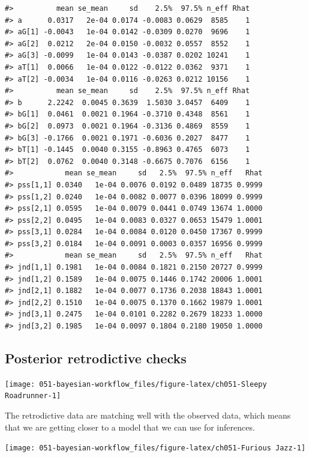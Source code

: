 \documentclass[11pt, oneside, openany]{scrbook}
\begin{document}
\begin{verbatim}
#>          mean se_mean     sd    2.5%  97.5% n_eff Rhat
#> a      0.0317   2e-04 0.0174 -0.0083 0.0629  8585    1
#> aG[1] -0.0043   1e-04 0.0142 -0.0309 0.0270  9696    1
#> aG[2]  0.0212   2e-04 0.0150 -0.0032 0.0557  8552    1
#> aG[3] -0.0099   1e-04 0.0143 -0.0387 0.0202 10241    1
#> aT[1]  0.0066   1e-04 0.0122 -0.0122 0.0362  9371    1
#> aT[2] -0.0034   1e-04 0.0116 -0.0263 0.0212 10156    1
#>          mean se_mean     sd    2.5%  97.5% n_eff Rhat
#> b      2.2242  0.0045 0.3639  1.5030 3.0457  6409    1
#> bG[1]  0.0461  0.0021 0.1964 -0.3710 0.4348  8561    1
#> bG[2]  0.0973  0.0021 0.1964 -0.3136 0.4869  8559    1
#> bG[3] -0.1766  0.0021 0.1971 -0.6036 0.2027  8477    1
#> bT[1] -0.1445  0.0040 0.3155 -0.8963 0.4765  6073    1
#> bT[2]  0.0762  0.0040 0.3148 -0.6675 0.7076  6156    1
#>            mean se_mean     sd   2.5%  97.5% n_eff   Rhat
#> pss[1,1] 0.0340   1e-04 0.0076 0.0192 0.0489 18735 0.9999
#> pss[1,2] 0.0240   1e-04 0.0082 0.0077 0.0396 18099 0.9999
#> pss[2,1] 0.0595   1e-04 0.0079 0.0441 0.0749 13674 1.0000
#> pss[2,2] 0.0495   1e-04 0.0083 0.0327 0.0653 15479 1.0001
#> pss[3,1] 0.0284   1e-04 0.0084 0.0120 0.0450 17367 0.9999
#> pss[3,2] 0.0184   1e-04 0.0091 0.0003 0.0357 16956 0.9999
#>            mean se_mean     sd   2.5%  97.5% n_eff   Rhat
#> jnd[1,1] 0.1981   1e-04 0.0084 0.1821 0.2150 20727 0.9999
#> jnd[1,2] 0.1589   1e-04 0.0075 0.1446 0.1742 20006 1.0001
#> jnd[2,1] 0.1882   1e-04 0.0077 0.1736 0.2038 18843 1.0001
#> jnd[2,2] 0.1510   1e-04 0.0075 0.1370 0.1662 19879 1.0001
#> jnd[3,1] 0.2475   1e-04 0.0101 0.2282 0.2679 18233 1.0000
#> jnd[3,2] 0.1985   1e-04 0.0097 0.1804 0.2180 19050 1.0000
\end{verbatim}

\hypertarget{iter2-post-retro}{%
\subsection{Posterior retrodictive checks}\label{iter2-post-retro}}

\begin{center}\texttt{[image: 051-bayesian-workflow\_files/figure-latex/ch051-Sleepy Roadrunner-1]} \end{center}

The retrodictive data are matching well with the observed data, which means that we are getting closer to a model that we can use for inferences.

\begin{center}\texttt{[image: 051-bayesian-workflow\_files/figure-latex/ch051-Furious Jazz-1]} \end{center}
\end{document}
